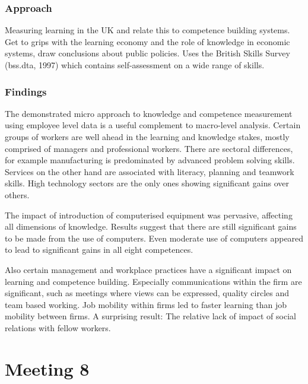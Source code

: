 \documentclass[12pt,a4paper]{article}
\begin{document}
      \subsubsection{Approach}
        Measuring learning in the UK and relate this to competence building systems. Get to grips with the learning economy and the role of knowledge in economic systems, draw conclusions about public policies. Uses the British Skills Survey (bss.dta, 1997) which contains self-assessment on a wide range of skills.

      \subsubsection{Findings}
        The demonstrated micro approach to knowledge and competence measurement using employee level data is a useful complement to macro-level analysis. Certain groups of workers are well ahead in the learning and knowledge stakes, mostly comprised of managers and professional workers. There are sectoral differences, for example manufacturing is predominated by advanced problem solving skills. Services on the other hand are associated with literacy, planning and teamwork skills. High technology sectors are the only ones showing significant gains over others.

        The impact of introduction of computerised equipment was pervasive, affecting all dimensions of knowledge. Results suggest that there are still significant gains to be made from the use of computers. Even moderate use of computers appeared to lead to significant gains in all eight competences.

        Also certain management and workplace practices have a significant impact on learning and competence building. Especially communications within the firm are significant, such as meetings where views can be expressed, quality circles and team based working. Job mobility within firms led to faster learning than job mobility between firms. A surprising result: The relative lack of impact of social relations with fellow workers.


  \section{Meeting 8} %
  \label{sec:Meeting 8}
\end{document}
